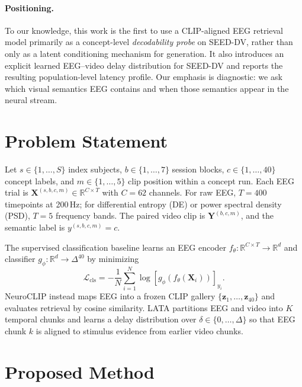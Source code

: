 \documentclass{article}
\begin{document}
\paragraph{Positioning.}
To our knowledge, this work is the first to use a CLIP-aligned EEG retrieval
model primarily as a concept-level \emph{decodability probe} on SEED-DV, rather
than only as a latent conditioning mechanism for generation. It also introduces
an explicit learned EEG--video delay distribution for SEED-DV and reports the
resulting population-level latency profile. Our emphasis is diagnostic: we ask
which visual semantics EEG contains and when those semantics appear in the
neural stream.

\section{Problem Statement}

Let $s \in \{1,\ldots,S\}$ index subjects, $b \in \{1,\ldots,7\}$ session
blocks, $c \in \{1,\ldots,40\}$ concept labels, and $m \in \{1,\ldots,5\}$
clip position within a concept run. Each EEG trial is
$\mathbf{X}^{(s,b,c,m)} \in \mathbb{R}^{C \times T}$ with $C{=}62$ channels.
For raw EEG, $T{=}400$ timepoints at 200\,Hz; for differential entropy (DE) or
power spectral density (PSD), $T{=}5$ frequency bands. The paired video clip is
$\mathbf{Y}^{(b,c,m)}$, and the semantic label is $y^{(s,b,c,m)}=c$.

The supervised classification baseline learns an EEG encoder
$f_\theta : \mathbb{R}^{C \times T} \to \mathbb{R}^d$ and classifier
$g_\phi : \mathbb{R}^d \to \Delta^{40}$ by minimizing
\begin{equation}
    \mathcal{L}_{\mathrm{cls}}
    = -\frac{1}{N}\sum_{i=1}^{N}
      \log \left[g_\phi(f_\theta(\mathbf{X}_i))\right]_{y_i}.
\end{equation}
NeuroCLIP instead maps EEG into a frozen CLIP gallery
$\{\mathbf{z}_1,\ldots,\mathbf{z}_{40}\}$ and evaluates retrieval by cosine
similarity. LATA partitions EEG and video into $K$ temporal chunks and learns a
delay distribution over $\delta \in \{0,\ldots,\Delta\}$ so that EEG chunk $k$
is aligned to stimulus evidence from earlier video chunks.

\section{Proposed Method}
\end{document}

